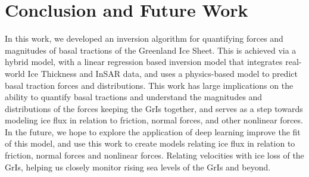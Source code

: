 \documentclass{article}
\begin{document}
\section{Conclusion and Future Work}

In this work, we developed an inversion algorithm for quantifying forces and magnitudes of basal tractions of the Greenland Ice Sheet. This is achieved via a hybrid model, with a linear regression based inversion model that integrates real-world Ice Thickness and InSAR data, and uses a physics-based model to predict basal traction forces and distributions. This work has large implications on the ability to quantify basal tractions and understand the magnitudes and distributions of the forces keeping the GrIs together, and serves as a step towards modeling ice flux in relation to friction, normal forces, and other nonlinear forces. In the future, we hope to explore the application of deep learning improve the fit of this model, and use this work to create models relating ice flux in relation to friction, normal forces and nonlinear forces. Relating velocities with ice loss of the GrIs, helping us closely monitor rising sea levels of the GrIs and beyond.



\end{document}
